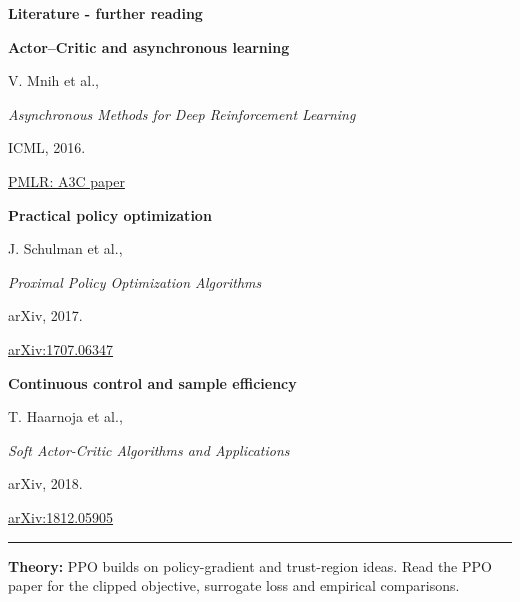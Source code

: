 \documentclass[xcolor=dvipsnames]{beamer}
\begin{document}
\begin{frame}{\bf Literature - further reading}

  \small

  \textbf{Actor--Critic and asynchronous learning}

  V. Mnih et al.,

  \textit{Asynchronous Methods for Deep Reinforcement Learning}

  ICML, 2016.

  \href{https://proceedings.mlr.press/v48/mniha16.html}
       {PMLR: A3C paper}

  \vspace{0.2cm}
  \textbf{Practical policy optimization}

  J. Schulman et al.,

  \textit{Proximal Policy Optimization Algorithms}

  arXiv, 2017.

  \href{https://arxiv.org/abs/1707.06347}
       {arXiv:1707.06347}

  \vspace{0.2cm}
  \textbf{Continuous control and sample efficiency}

  T. Haarnoja et al.,

  \textit{Soft Actor-Critic Algorithms and Applications}

  arXiv, 2018.

  \href{https://arxiv.org/abs/1812.05905}
       {arXiv:1812.05905}

  \vfill
  \hrule
  \vspace{0.1cm}

  \footnotesize
  \textbf{Theory:} PPO builds on policy-gradient and
  trust-region ideas. Read the PPO paper for the clipped
  objective, surrogate loss and empirical comparisons.

\end{frame}
\end{document}
